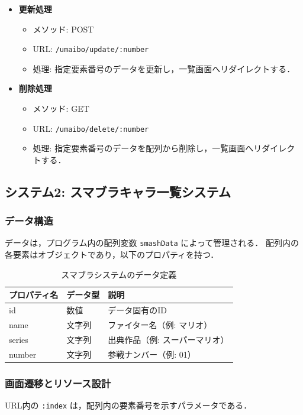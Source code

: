 \documentclass[uplatex,dvipdfmx]{jsarticle}
\begin{document}
\begin{itemize}
    \item \textbf{更新処理}
    \begin{itemize}
        \item メソッド: POST
        \item URL: \texttt{/umaibo/update/:number}
        \item 処理: 指定要素番号のデータを更新し，一覧画面へリダイレクトする．
    \end{itemize}

    \item \textbf{削除処理}
    \begin{itemize}
        \item メソッド: GET
        \item URL: \texttt{/umaibo/delete/:number}
        \item 処理: 指定要素番号のデータを配列から削除し，一覧画面へリダイレクトする．
    \end{itemize}
\end{itemize}

\subsection{システム2: スマブラキャラ一覧システム}

\subsubsection{データ構造}
データは，プログラム内の配列変数 \texttt{smashData} によって管理される．
配列内の各要素はオブジェクトであり，以下のプロパティを持つ．

\begin{table}[h]
    \centering
    \caption{スマブラシステムのデータ定義}
    \begin{tabular}{|l|l|l|}
        \hline
        プロパティ名 & データ型 & 説明 \\
        \hline
        id & 数値 & データ固有のID \\
        name & 文字列 & ファイター名（例: マリオ） \\
        series & 文字列 & 出典作品（例: スーパーマリオ） \\
        number & 文字列 & 参戦ナンバー（例: 01） \\
        \hline
    \end{tabular}
\end{table}

\subsubsection{画面遷移とリソース設計}
URL内の \texttt{:index} は，配列内の要素番号を示すパラメータである．
\end{document}
